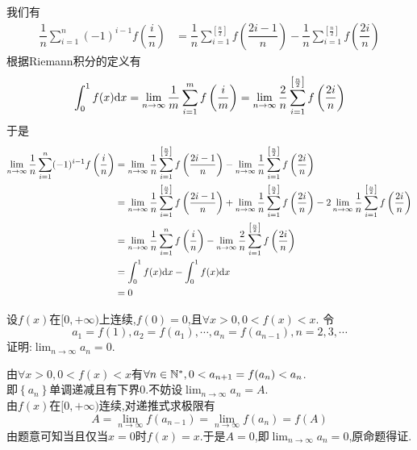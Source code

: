 \documentclass{ctexart}
\begin{document}
\begin{solution}[Solution.]
    我们有
    $$\begin{aligned}
        \dfrac{1}{n}\sum_{i=1}^{n}(-1)^{i-1}f\left(\dfrac{i}{n}\right)
        &= \dfrac{1}{n}\sum_{i=1}^{\left[\frac{n}{2}\right]}f\left(\dfrac{2i-1}{n}\right)-\dfrac{1}{n}\sum_{i=1}^{\left[\frac{n}{2}\right]}f\left(\dfrac{2i}{n}\right)
    \end{aligned}$$
    根据Riemann积分的定义有
    $$\int_0^1f(x)\mathrm{d} x=\lim_{n\to\infty}\dfrac{1}{m}\sum_{i=1}^{m}f\left(\dfrac{i}{m}\right)=\lim_{n\to\infty}{\dfrac{2}{n}\sum_{i=1}^{\left[\frac{n}{2}\right]}f\left(\dfrac{2i}{n}\right)}$$
    于是
    $$\begin{aligned}
        \lim_{n\to\infty}\dfrac{1}{n}\sum_{i=1}^{n}(-1)^{i-1}f\left(\dfrac{i}{n}\right)
        &= \lim_{n\to\infty}\dfrac{1}{n}\sum_{i=1}^{\left[\frac{n}{2}\right]}f\left(\dfrac{2i-1}{n}\right)-\lim_{n\to\infty}\dfrac{1}{n}\sum_{i=1}^{\left[\frac{n}{2}\right]}f\left(\dfrac{2i}{n}\right) \\
        &= \lim_{n\to\infty}\dfrac{1}{n}\sum_{i=1}^{\left[\frac{n}{2}\right]}f\left(\dfrac{2i-1}{n}\right)+\lim_{n\to\infty}\dfrac{1}{n}\sum_{i=1}^{\left[\frac{n}{2}\right]}f\left(\dfrac{2i}{n}\right)-2\lim_{n\to\infty}\dfrac{1}{n}\sum_{i=1}^{\left[\frac{n}{2}\right]}f\left(\dfrac{2i}{n}\right) \\
        &= \lim_{n\to\infty}\dfrac{1}{n}\sum_{i=1}^{n}f\left(\dfrac{i}{n}\right)-\lim_{n\to\infty}\dfrac{2}{n}\sum_{i=1}^{\left[\frac{n}{2}\right]}f\left(\dfrac{2i}{n}\right) \\
        &= \int_0^1f(x)\mathrm{d} x-\int_0^1f(x)\mathrm{d} x \\
        &= 0
    \end{aligned}$$
\end{solution}
\begin{problem}[7.(10\songti{分})]
    设$f(x)$在$[0,+\infty)$上连续,$f(0)=0$,且$\forall x>0,0<f(x)<x$.
    令$$a_1=f(1),a_2=f(a_1),\cdots,a_n=f(a_{n-1}),n=2,3,\cdots$$
    证明:$\displaystyle\lim_{n\to\infty}a_n=0$.
\end{problem}
\begin{solution}[Proof.]
    由$\forall x>0,0<f(x)<x$有$\forall n\in\mathbb{N}^*,0<a_{n+1}=f(a_n)<a_n$.\\
    即$\left\{a_n\right\}$单调递减且有下界$0$.不妨设$\displaystyle\lim_{n\to\infty}{a_n}=A$.\\
    由$f(x)$在$[0,+\infty)$连续,对递推式求极限有$$A=\lim_{n\to\infty}f\left(a_{n-1}\right)=\lim_{n\to\infty}f\left(a_n\right)=f(A)$$
    由题意可知当且仅当$x=0$时$f(x)=x$.于是$A=0$,即$\displaystyle\lim_{n\to\infty}a_n=0$,原命题得证.
\end{solution}
\end{document}
